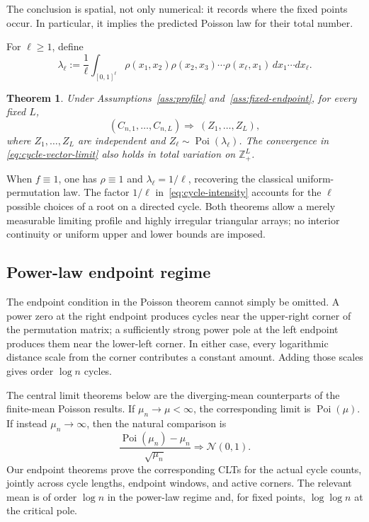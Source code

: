 \documentclass[11pt]{article}
\newtheorem{theorem}{Theorem}[section]
\theoremstyle{remark}
\theoremstyle{plain}
\newcommand{\Poi}{\operatorname{Poi}}
\begin{document}
The conclusion is spatial, not only numerical: it records where the fixed
points occur.  In particular, it implies the predicted Poisson law for their
total number.

For $\ell\ge1$, define
\begin{equation}\label{eq:cycle-intensity}
 \lambda_\ell:=\frac1\ell\int_{[0,1]^\ell}
 \rho(x_1,x_2)\rho(x_2,x_3)\cdots\rho(x_\ell,x_1)
 \,dx_1\cdots dx_\ell.
\end{equation}

\begin{theorem}\label{thm:short-cycles}
Under Assumptions~\ref{ass:profile} and~\ref{ass:fixed-endpoint}, for every
fixed $L$,
\begin{equation}\label{eq:cycle-vector-limit}
 (C_{n,1},\ldots,C_{n,L}) \Longrightarrow\
 (Z_1,\ldots,Z_L),
\end{equation}
where $Z_1,\ldots,Z_L$ are independent and
$Z_\ell\sim\Poi(\lambda_\ell)$.  The convergence in
\eqref{eq:cycle-vector-limit} also holds in total variation on
$\mathbb Z_+^L$.
\end{theorem}

When $f\equiv1$, one has $\rho\equiv1$ and
$\lambda_\ell=1/\ell$, recovering the classical uniform-permutation law.
The factor $1/\ell$ in~\eqref{eq:cycle-intensity} accounts for the $\ell$
possible choices of a root on a directed cycle.  Both theorems allow a merely
measurable limiting profile and highly irregular triangular arrays; no
interior continuity or uniform upper and lower bounds are imposed.

\subsection{Power-law endpoint regime}

The endpoint condition in the Poisson theorem cannot simply be omitted.  A
power zero at the right endpoint produces cycles near the upper-right corner
of the permutation matrix; a sufficiently strong power pole at the left
endpoint produces them near the lower-left corner.  In either case, every
logarithmic distance scale from the corner contributes a constant amount.
Adding those scales gives order $\log n$ cycles.

The central limit theorems below are the diverging-mean counterparts of the
finite-mean Poisson results.  If $\mu_n\to\mu<\infty$, the corresponding
limit is $\Poi(\mu)$.  If instead $\mu_n\to\infty$, then the natural
comparison is
\[
 \frac{\Poi(\mu_n)-\mu_n}{\sqrt{\mu_n}}
 \Longrightarrow\mathcal N(0,1).
\]
Our endpoint theorems prove the corresponding CLTs for the actual cycle
counts, jointly across cycle lengths, endpoint windows, and active corners.
The relevant mean is of order $\log n$ in the power-law regime and, for fixed
points, $\log\log n$ at the critical pole.
\end{document}
